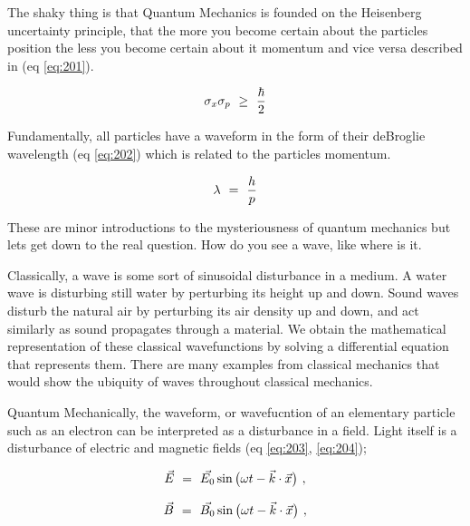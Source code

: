 \documentclass{article}
\begin{document}
The shaky thing is that Quantum Mechanics is founded on the Heisenberg uncertainty principle, that the more you become certain about the particles position the less you become certain about it momentum and vice versa described in (eq \ref{eq:201}).

\begin{equation} \label{eq:201}
\sigma_{x}\sigma_{p} \hspace{0.125cm} \geq \hspace{0.125cm} \frac{\hbar}{2}
\end{equation}

Fundamentally, all particles have a waveform in the form of their deBroglie wavelength (eq \ref{eq:202}) which is related to the particles momentum. 

\begin{equation} \label{eq:202}
\lambda \hspace{0.125cm} = \hspace{0.125cm} \frac{h}{p}
\end{equation}

These are minor introductions to the mysteriousness of quantum mechanics but lets get down to the real question. How do you see a wave, like where is it. 

Classically, a wave is some sort of sinusoidal disturbance in a medium. A water wave is disturbing still water by perturbing its height up and down. Sound waves disturb the natural air by perturbing its air density up and down, and act similarly as sound propagates through a material. We obtain the mathematical representation of these classical wavefunctions by solving a differential equation that represents them. There are many examples from classical mechanics that would show the ubiquity of waves throughout classical mechanics.

Quantum Mechanically, the waveform, or wavefucntion of an elementary particle such as an electron can be interpreted as a disturbance in a field. Light itself is a disturbance of electric and magnetic fields (eq \ref{eq:203}, \ref{eq:204});

\begin{equation} \label{eq:203}
\vec{E} \hspace{0.125cm} = \hspace{0.125cm}  \vec{E_{0}}\sin{\big(\omega t - \vec{k}\cdot\vec{x}\big)} \hspace{0.125cm} , 
\end{equation}

\begin{equation} \label{eq:204}
\vec{B} \hspace{0.125cm} = \hspace{0.125cm}  \vec{B_{0}}\sin{\big(\omega t - \vec{k}\cdot\vec{x}\big)} \hspace{0.125cm} , 
\end{equation}
\end{document}
